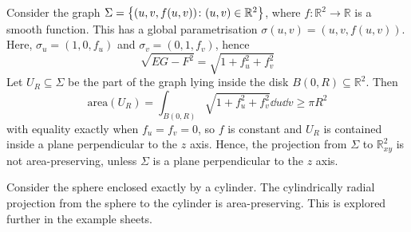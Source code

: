 \begin{example}
	Consider the graph \( \Sigma = \qty{(u,v,f(u,v)) \colon (u,v) \in \mathbb R^2} \), where \( f \colon \mathbb R^2 \to \mathbb R \) is a smooth function.
	This has a global parametrisation \( \sigma(u,v) = (u,v,f(u,v)) \).
	Here, \( \sigma_u = (1,0,f_u) \) and \( \sigma_v = (0,1,f_v) \), hence
	\[ \sqrt{EG - F^2} = \sqrt{1+f_u^2+f_v^2} \]
	Let \( U_R \subseteq \Sigma \) be the part of the graph lying inside the disk \( B(0,R) \subseteq \mathbb R^2 \).
	Then
	\[ \mathrm{area}(U_R) = \int_{B(0,R)} \sqrt{1+f_u^2+f_v^2} \dd{u}\dd{v} \geq \pi R^2 \]
	with equality exactly when \( f_u = f_v = 0 \), so \( f \) is constant and \( U_R \) is contained inside a plane perpendicular to the \( z \) axis.
	Hence, the projection from \( \Sigma \) to \( \mathbb R^2_{xy} \) is not area-preserving, unless \( \Sigma \) is a plane perpendicular to the \( z \) axis.
\end{example}
\begin{example}
	Consider the sphere enclosed exactly by a cylinder.
	The cylindrically radial projection from the sphere to the cylinder is area-preserving.
	This is explored further in the example sheets.
\end{example}

